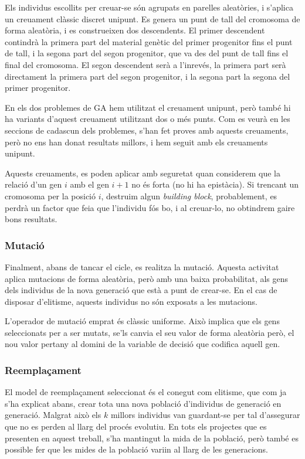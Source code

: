 Els individus escollits per creuar-se són agrupats en parelles aleatòries, i
s'aplica un creuament clàssic discret unipunt.  Es genera un punt de tall del
cromosoma de forma aleatòria, i es construeixen dos descendents. El primer
descendent contindrà la primera part del material genètic del primer progenitor
fins el punt de tall, i la segona part del segon progenitor, que va des del punt
de tall fins el final del cromosoma. El segon descendent serà a l'inrevés, la
primera part serà directament la primera part del segon progenitor, i la segona
part la segona del primer progenitor.

En els dos problemes de GA hem utilitzat el creuament unipunt, però també hi
ha variants d'aquest creuament utilitzant dos o més punts.  Com es veurà en les
seccions de cadascun dels problemes, s'han fet proves amb aquests creuaments,
però no ens han donat resultats millors, i hem seguit amb els creuaments
unipunt.

Aquests creuaments, es poden aplicar amb seguretat quan considerem que la
relació d'un gen $i$ amb el gen $i+1$ no és forta (no hi ha epistàcia).  Si
trencant un cromosoma per la posició $i$, destruim algun \emph{building block},
probablement, es perdrà un factor que feia que l'individu fós bo, i al
creuar-lo, no obtindrem gaire bons resultats.

\subsubsection{Mutació}

Finalment, abans de tancar el cicle, es realitza la mutació. Aquesta activitat
aplica mutacions de forma aleatòria, però amb una baixa probabilitat, als gens
dels individus de la nova generació que està a punt de crear-se. En el cas de
disposar d'elitisme, aquests individus no són exposats a les mutacions.

L'operador de mutació emprat és clàssic uniforme. Això implica que els gens
seleccionats per a ser mutats, se'ls canvia el seu valor de forma aleatòria
però, el nou valor pertany al domini de la variable de decisió que codifica
aquell gen.

\subsubsection{Reemplaçament}

El model de reemplaçament seleccionat és el conegut com elitisme, que com ja
s'ha explicat abans, crear tota una nova població d'individus de generació en
generació. Malgrat això els $k$ millors individus van guardant-se per tal
d'assegurar que no es perden al llarg del procés evolutiu.  En tots els
projectes que es presenten en aquest treball, s'ha mantingut la mida de la
població, però també es possible fer que les mides de la població variin al
llarg de les generacions.

